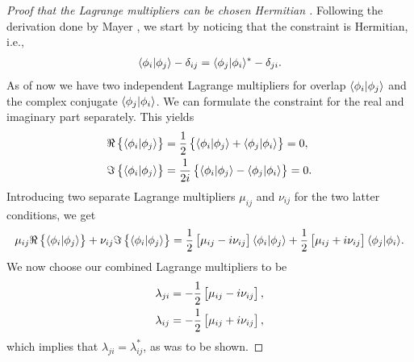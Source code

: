         \begin{proof}[%
                Proof that the Lagrange multipliers can be chosen Hermitian%
            ]
            Following the derivation done by Mayer \cite{mayer2003simple}, we
            start by noticing that the constraint is Hermitian, i.e.,
            \begin{align}
                \langle \phi_i | \phi_j \rangle - \delta_{ij}
                = \langle \phi_j | \phi_i \rangle^{*} - \delta_{ji}.
            \end{align}
            As of now we have two independent Lagrange multipliers for overlap
            $\langle \phi_i | \phi_j \rangle$ and the complex conjugate
            $\langle \phi_j | \phi_i \rangle$. We can formulate the constraint for the
            real and imaginary part separately. This yields
            \begin{align}
                \Re\left\{ 
                    \langle \phi_i | \phi_j \rangle
                 \right\}
                &=
                \frac{1}{2}\left\{ 
                    \langle \phi_i | \phi_j \rangle
                    + \langle \phi_j | \phi_i \rangle
                 \right\}
                = 0,
                \\
                \Im\left\{ 
                    \langle \phi_i | \phi_j \rangle
                 \right\}
                &=
                \frac{1}{2i}\left\{ 
                    \langle \phi_i | \phi_j \rangle
                    - \langle \phi_j | \phi_i \rangle
                 \right\}
                = 0.
            \end{align}
            Introducing two separate Lagrange multipliers $\mu_{ij}$ and
            $\nu_{ij}$ for the two latter conditions, we get
            \begin{align}
                \mu_{ij}\Re\left\{ 
                    \langle \phi_i | \phi_j \rangle
                 \right\}
                + \nu_{ij}\Im\left\{ 
                    \langle \phi_i | \phi_j \rangle
                 \right\}
                =
                \frac{1}{2}\left[ 
                    \mu_{ij} - i\nu_{ij}
                 \right]
                \langle \phi_i | \phi_j \rangle
                + \frac{1}{2}\left[ 
                    \mu_{ij} + i\nu_{ij}
                 \right]
                \langle \phi_j | \phi_i \rangle.
            \end{align}
            We now choose our combined Lagrange multipliers to be
            \begin{align}
                \lambda_{ji} &=
                -\frac{1}{2}\left[ 
                    \mu_{ij} - i\nu_{ij}
                 \right], \\
                \lambda_{ij} &=
                -\frac{1}{2}\left[ 
                    \mu_{ij} + i\nu_{ij}
                 \right],
            \end{align}
            which implies that $\lambda_{ji} = \lambda_{ij}^{*}$, as was to be
            shown.
        \end{proof}


